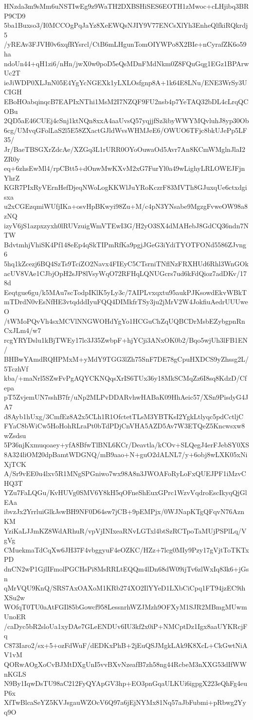 HNzda3m9sMm6uNSTIwEg9z9WaTH2DXBSHiSES6EOTH1zMwoc+cLHjibq3BRP9CD9
5ba1Buxso3/I0MCCOgPqJaYz8XeEWQsNJIY9V77ENCsXlYh3EnheQlfkiRQkrdj5
/yREAv3FJVH0v6xqfRYsrcl/CtB6mLHgunTomOIYWPo8X2BIe+nCyrafZK6o59ha
ndoUn44+qH1zi6/nHn/jwX0w0poD5eQsMDnFMdNkm0Z8FQuGqg1EGz1BPArwUc2T
ieJiWDP0XLJnN05E4YgYcNGEXk1yLXLOsfgnp8A+1k64E8LNu/ENE3WrSy3UCIGH
EBoHOabqinqcB7EAPIxNThi1MsM2I7NZQF9FU2nsb4p7YeTAQ32bDL4cLrqQCOBu
2QD5aE46CUEj4cSnj1ktNQn8xxA4aaUvsQ57yqjjfSz3ibyWWYMQvluhJ8yp30Ob
6cg/UMvqGFolLaS2l5E58ZXactGJldWvsWHMJeE6/OWUO6TFjc8bkUJePp5LF35/
Jr/BaeTBSGXrZdcAe/XZGq3L1rURR0OYoOuwaOd5Avr7An8KCmWMglnJlaI2ZR0y
eq+6zhsEwMl4/rpCBtt5+dOnwMwKXvM2xG7FurYl0a49wLighyLRLOWEJFjnYhrZ
KGR7PIxRyVErnHefDjeqNWoLogKKWlJuYRoKczrF83MVTh8GJuxqUe6ctxdgisxa
u2xCGEzqmiWUfjIKa+osvHpBKwyi98Zu+M/c4pN3YNsabe9MgzgFvweOW98a8zNQ
izyV6jS1azpxzyxh0lRUVzuigWmVTEwI3G/H2yO3SX4dMAHebJ8GdCQ36ndn7NTW
BdvtmhjVhiSK4Pf148eEp4qSkTIPmRfKa9pgjJGeG3iYdiTYOTFONd5586ZJvng6
5hq1kZcezj6BQ4SzTs9TciZO2Navx4FIEyC5CTsrniTNflNzFRXHUd6Rhl3WnGOk
acUV8VAe1CJbjOpH2sJP8lVsyWqO72RFHqLQNUGcrs7ud6kFdQioz7adDKv/178d
Eeqtgue6gu/k5MAu7scTodpIKlK5yLy3c/7AIPLvxqxtu95aukPJKsowdEkvWBkT
mTDrdN0vEsNfHE3vtqdddIyuFQQ4DIMkfrTSy3ju2jMrV2W4JokfiuAedrUUUweO
/tWMoPQvVh4sxMCVlNNGWOHdYgYo1HCGuChZqUQBCDrMsbEZybgpnRnCxJLm4/w7
rcgYRYDslu1kBjTWEy17lc3J35ZwbpF+hjYCji3ANxOK0b2/Bqo5wjUh3lFB1EN/
BHBwYAmdRQHPMxM+yMdY9TGG3lZh75SnF7DE78gCpuHXDCS9yZhssg2L/5TczhVf
kba/+maNrl5SZwFvPgAQYCKNQqsXrIS6TUx36y18MkSCMqZz6I8sq8KdzD/Cfepa
pT5ZvjemUN7sshB7fr/uNp2MLPvDDARvhwHABaK09HhAeic57/XSn9PisdyG4JA7
d8Ayb1hUxg/3CmfEz8A2x5CLh1R1OfctetTLsM3YBTKsI2YgkLtlyqc5pdCctljC
FYaC8bWiCw5HoHohRLraPt0bTdPDjCnVHA5AZD5Av7W3ETQeZ5Kncwsxw8wZsdsu
5P36njKxmuqoaey+yfA8BfwTlBNL6KCr/Deavtla/kCOv+SLQegJ4erFJebSY0XS
8A324liOM20dpBamtWDGNQ/mB9aao+N+guO2dALNL7/y+6obj8wLXK05xNiXjTCK
A/Sr9vEE0u4lxv5R1MNgSPGniwo7wx98A8n3JWOAFoRyLoFxQUEJPF1iMzvCHQ3T
YZu7FaLQGu/KvHUVg0SMV6Y8kH5qOFneShEuxGPrc1WzvVqdroEscIkyqQjGlEAa
ibvzJx2YrrluiGlkJswBH9NF0D64sw7jCB+9pEMPjx/0WJNapKTgQFqvN76AznKM
YziKaLJJmKZ8WdARhuR/vpVjINIxeaRNvLGTxl4btSzRCTpoTaMUjPSPlLq/VgVg
CMuekmaTdCqXw6JH37F4vbggyuF4eOZKC/HZz+7lcg0MIy9Pzy17gVjtToTKTxPD
dnCN2wP1GjlIFmolPGCHsPi8MsRRLtEQQm4lDn68dW09ijTv6zlWxIq83k6+jGsn
qMrVQU9KnQ/SRS7AxOAXoM1KRb274XO2IlYYeD1LXbCiCpq1FT94jzEC9ihXSu2w
WOfqT0TU0aAtFGIl85bGowcf958LessnrhWZJMzh9OFXyM1SJR2MBmgMUwmUnoER
/caDyc5bR2sloUa1xyDAe7GLeENDUv6IU3kf2x0iP+NMCptDz1Igx8aaUYKRcjFq
C873Iaro2/sx+5+ozFdWuF/dEDKxPhB+2jEuQSJMgkLAk9K8XcL+CkGwtNiAV1vM
QORwAOgXoCvBJMtDXgUnI5vvBXvNzeafB7zh58ng44RcbeM3nXXG53dIfWWnKGLS
N9By1IqwDsTU98aC212FyQYApGV3hp+EO3pnGqaULKUi6igpgX223eQhFg4euP6x
XfTwBlcaSeYZ5KVJsgauWZOcV6Q97a6jEjNYMx81Nq57aJbFubmi+pRbwg2Yyq9O
